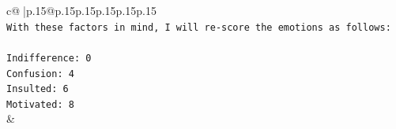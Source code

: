 \documentclass{article}
\begin{document}
{\begin{supertabular}{c@{$\;$}|p{.15\linewidth}@{}p{.15\linewidth}p{.15\linewidth}p{.15\linewidth}p{.15\linewidth}p{.15\linewidth}}
{{{\\ 
\texttt{With these factors in mind, I will re{-}score the emotions as follows:} \\
\\ 
\texttt{Indifference: 0} \\
\texttt{Confusion: 4} \\
\texttt{Insulted: 6} \\
\texttt{Motivated: 8} \\
            }
        }
    }
    & \\ \\

\end{supertabular}
}
\end{document}
